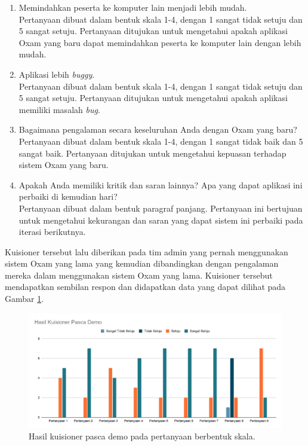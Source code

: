 \begin{enumerate}
        \item Memindahkan peserta ke komputer lain menjadi lebih mudah. \\
            Pertanyaan dibuat dalam bentuk skala 1-4, dengan 1 sangat tidak setuju dan 5 sangat setuju.
            Pertanyaan ditujukan untuk mengetahui apakah aplikasi Oxam yang baru dapat memindahkan
            peserta ke komputer lain dengan lebih mudah.
        
        
        \item Aplikasi lebih \textit{buggy}. \\
            Pertanyaan dibuat dalam bentuk skala 1-4, dengan 1 sangat tidak setuju dan 5 sangat setuju.
            Pertanyaan ditujukan untuk mengetahui apakah aplikasi memiliki masalah \textit{bug}.
        
        
        \item Bagaimana pengalaman secara keseluruhan Anda dengan Oxam yang baru? \\
            Pertanyaan dibuat dalam bentuk skala 1-4, dengan 1 sangat tidak baik dan 5 sangat baik.
            Pertanyaan ditujukan untuk mengetahui kepuasan terhadap sistem Oxam yang baru.
        
        
        \item Apakah Anda memiliki kritik dan saran lainnya? Apa yang dapat aplikasi ini perbaiki di kemudian hari? \\
            Pertanyaan dibuat dalam bentuk paragraf panjang. Pertanyaan ini bertujuan untuk mengetahui
            kekurangan dan saran yang dapat sistem ini perbaiki pada iterasi berikutnya.
    \end{enumerate}
    
    Kuisioner tersebut lalu diberikan pada tim admin yang pernah menggunakan sistem Oxam yang lama yang kemudian
    dibandingkan dengan pengalaman mereka dalam menggunakan sistem Oxam yang lama. Kuisioner tersebut mendapatkan
    sembilan respon dan didapatkan data yang dapat dilihat pada Gambar \ref{fig:kuisioner_demo}.
    \begin{figure}
        \centering
        \includegraphics[width=0.75\paperwidth]{Gambar/Hasil Kuisioner.pdf}
        \caption{Hasil kuisioner pasca demo pada pertanyaan berbentuk skala.}
        \label{fig:kuisioner_demo}
    \end{figure}
    
